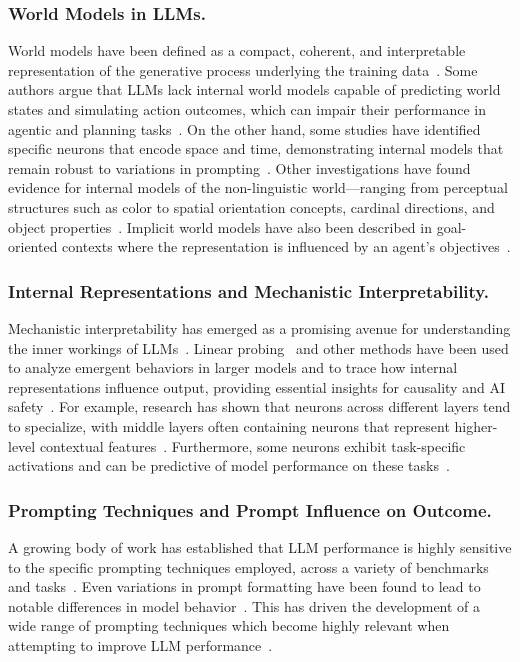 \documentclass[runningheads]{llncs}
\begin{document}
\subsubsection{World Models in LLMs.} World models have been defined as a compact, coherent, and interpretable representation of the generative process underlying the training data~\cite{GurneeTegmark2023,HaSchmidhuber2018,Vafa2024}. Some authors argue that LLMs lack internal world models capable of predicting world states and simulating action outcomes, which can impair their performance in agentic and planning tasks~\cite{Bisk2020,BenderEtAl2021}. On the other hand, some studies have identified specific neurons that encode space and time, demonstrating internal models that remain robust to variations in prompting~\cite{GurneeTegmark2023}. Other investigations have found evidence for internal models of the non-linguistic world—ranging from perceptual structures such as color to spatial orientation concepts, cardinal directions, and object properties~\cite{PatelPavlick2022,LiNyeAndreas2021,Abdou2021}. Implicit world models have also been described in goal-oriented contexts where the representation is influenced by an agent’s objectives~\cite{Li2021}.

\subsubsection{Internal Representations and Mechanistic Interpretability.} Mechanistic interpretability has emerged as a promising avenue for understanding the inner workings of LLMs~\cite{Olah2020,Elhage2021,Templeton2024}. Linear probing~\cite{AlainBengio2016} and other methods have been used to analyze emergent behaviors in larger models and to trace how internal representations influence output, providing essential insights for causality and AI safety~\cite{Wang2022,Nanda2023,Bereska2024}. For example, research has shown that neurons across different layers tend to specialize, with middle layers often containing neurons that represent higher-level contextual features~\cite{Geva2020,Durrani2022,Meng2022,Gurnee2023}. Furthermore, some neurons exhibit task-specific activations and can be predictive of model performance on these tasks~\cite{Meng2022,Wang2022b,LengXiong2024,Song2024}.

\subsubsection{Prompting Techniques and Prompt Influence on Outcome.} A growing body of work has established that LLM performance is highly sensitive to the specific prompting techniques employed, across a variety of benchmarks and tasks~\cite{Salinas2024,Leidinger2023,Anagnostidis2024}. Even variations in prompt formatting have been found to lead to notable differences in model behavior~\cite{Sclar2023}. This has driven the development of a wide range of prompting techniques which become highly relevant when attempting to improve LLM performance~\cite{Wei2022Chain,Sahoo2024}.
\end{document}

